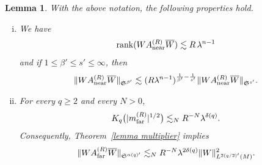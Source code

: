 \documentclass[12pt,reqno,a4paper]{amsart}
\newtheorem{lemma}[theorem]{Lemma}
\begin{document}
\begin{lemma}\label{lem:near_far} With the above notation, the following properties hold.
     \begin{enumerate}[(i)]
    \item We have
          \begin{align}\label{eq:rank-Anear-R}
            \operatorname{rank} (WA_{\rm near}^{(R)}\overline{W})\lesssim R\,\lambda^{n-1}
          \end{align}
   and if \(1\leq \beta'\leq s'\leq \infty\), then
          \begin{align}\label{eq:rank-improvement-Anear-R}
            \|WA_{\rm near}^{(R)}\overline{W}\|_{\mathfrak{S}^{\beta'}}
            \lesssim
            (R\lambda^{n-1})^{\frac1{\beta'}-\frac1{s'}}
            \|WA_{\rm near}^{(R)}\overline{W}\|_{\mathfrak{S}^{s'}}.
          \end{align}       

    \item For every \(q\geq 2\) and every \(N>0\),
          \begin{align}\label{Kq-mfar-R}
            K_q\big(|m_{\rm far}^{(R)}|^{1/2}\big)
            \lesssim_N
            R^{-N}\lambda^{\delta(q)}.
          \end{align}
          Consequently, Theorem~\ref{lemma multiplier} implies
          \begin{align}\label{eq:Afar-negligible-R}
            \|WA_{\rm far}^{(R)}\overline{W}\|_{\mathfrak{S}^{\alpha(q)'}}
            \lesssim_N
            R^{-N}\lambda^{2\delta(q)}
            \|W\|_{L^{2(q/2)'}(M)}^2.
          \end{align}
  \end{enumerate}
\end{lemma}
\end{document}

